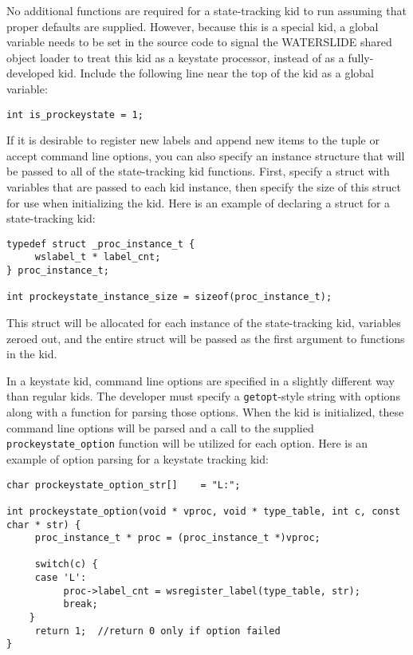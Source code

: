 \documentclass[11pt]{article}
\begin{document}
No additional functions are required for a state-tracking kid to run assuming 
that proper defaults are supplied.  However, because this is a special kid, a 
global variable needs to be set in the source code to signal the WATERSLIDE 
shared object loader to treat this kid as a keystate processor, instead of as a
fully-developed kid. Include the following line near the top of the kid as a
global variable:

\begin{lstlisting}
int is_prockeystate = 1;
\end{lstlisting}

If it is desirable to register new labels and append new items to the 
tuple or accept command line options, you can also specify an instance 
structure that will be passed to all of the state-tracking kid functions.
First, specify a struct with variables that are passed to each kid instance, 
then specify the size of this struct for use when initializing the kid. Here is
an example of declaring a struct for a state-tracking kid:

\begin{lstlisting}
typedef struct _proc_instance_t {
     wslabel_t * label_cnt;
} proc_instance_t;

int prockeystate_instance_size = sizeof(proc_instance_t);
\end{lstlisting}

This struct will be allocated for each instance of the state-tracking kid, 
variables zeroed out, and the entire struct will be passed as the first 
argument to functions in the kid.

In a keystate kid, command line options are specified in a slightly different 
way than regular kids. The developer must specify a \texttt{getopt}-style 
string with  options along with a function for parsing those options.  When the
kid is initialized, these command line options will be parsed and a call to 
the supplied \texttt{prockeystate\_option} function will be utilized for each 
option. Here is an example of option parsing for a keystate tracking kid:

\begin{lstlisting}
char prockeystate_option_str[]    = "L:";

int prockeystate_option(void * vproc, void * type_table, int c, const char * str) {
     proc_instance_t * proc = (proc_instance_t *)vproc;

     switch(c) {
     case 'L':
          proc->label_cnt = wsregister_label(type_table, str);
          break;
	}
     return 1;  //return 0 only if option failed
}
\end{lstlisting}
\end{document}
